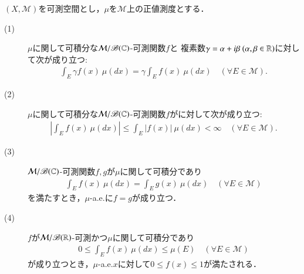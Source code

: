 	\begin{screen}
		\begin{thm}[正値測度に関する積分の性質]
			$(X,\mathcal{M})$を可測空間とし，$\mu$を$\mathcal{M}$上の正値測度とする．
			\begin{description}
				\item[(1)] $\mu$に関して可積分な$\mathcal{M}/\mathscr{B}(\mathbb{C})$-可測関数$f$と
					複素数$\gamma = \alpha + i \beta\ (\alpha,\beta \in \R)$に対して次が成り立つ:
					\begin{align}
						\int_E \gamma f(x)\ \mu(dx) = \gamma \int_E f(x)\ \mu(dx)
						\quad (\forall E \in \mathcal{M}).
					\end{align}
					
				\item[(2)] $\mu$に関して可積分な$\mathcal{M}/\mathscr{B}(\mathbb{C})$-可測関数$f$がに対して次が成り立つ:
					\begin{align}
						\left| \int_E f(x)\ \mu(dx) \right| \leq \int_E |f(x)|\ \mu(dx) < \infty
						\quad (\forall E \in \mathcal{M}).
					\end{align}
					
				\item[(3)] $\mathcal{M}/\mathscr{B}(\mathbb{C})$-可測関数$f,g$が$\mu$に関して可積分であり
					\begin{align}
						\int_E f(x)\ \mu(dx) = \int_E g(x)\ \mu(dx)
						\quad (\forall E \in \mathcal{M})
					\end{align}
					を満たすとき，$\mu$-a.e.に$f = g$が成り立つ．
					
				\item[(4)] $f$が$\mathcal{M}/\mathscr{B}(\mathbb{R})$-可測かつ$\mu$に関して可積分であり
					\begin{align}
						0 \leq \int_E f(x)\ \mu(dx) \leq \mu(E)
						\quad (\forall E \in \mathcal{M})
					\end{align}
					が成り立つとき，$\mu$-a.e.$x$に対して$0 \leq f(x) \leq 1$が満たされる．
			\end{description}
			
		\end{thm}
	\end{screen}
	
